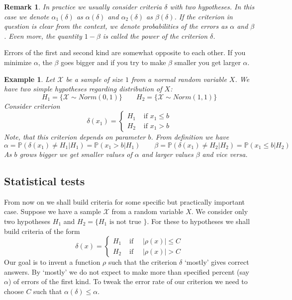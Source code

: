 \documentclass[12pt]{article}
\newtheorem{remark}[theorem]{Remark}
\newtheorem{example}[theorem]{Example}
\begin{document}
\begin{remark} In practice we usually consider criteria $\delta$ with two
    hypotheses. In this case we denote $\alpha_1(\delta)$ as $\alpha(\delta)$
    and $\alpha_2(\delta)$ as $\beta(\delta)$. If the criterion in question is
    clear from the context, we denote probabilities of the errors as $\alpha$
    and $\beta$. Even more, the quantity $1-\beta$ is called the power of the
    criterion $\delta$.
\end{remark}

Errors of the first and second kind are somewhat opposite to each other. If you
minimize $\alpha$, the $\beta$ goes bigger and if you try to make $\beta$
smaller you get larger $\alpha$.

\begin{example} Let $\mathscr{X}$ be a sample of size $1$ from a normal random
    variable $X$. We have two simple hypotheses regarding distribution of $X$:
    $$
        H_1=\{\mathscr{X}\sim Norm(0, 1)\}
        \quad\quad
        H_2=\{\mathscr{X}\sim Norm(1,1)\}
    $$
    Consider criterion
    $$
        \delta(x_1)=
        \begin{cases}
            H_1 & \mbox{ if } x_1\leq b \\
            H_2 & \mbox{ if } x_1> b
        \end{cases}
    $$
    Note, that this criterion depends on parameter $b$. From definition we have
    $$
        \alpha=\mathbb{P}(\delta(x_1)\neq H_1|H_1)=\mathbb{P}(x_1>b|H_1)
        \quad\quad
        \beta=\mathbb{P}(\delta(x_1)\neq H_2|H_2)=\mathbb{P}(x_1\leq b|H_2)
    $$
    As $b$ grows bigger we get smaller values of $\alpha$ and larger values
    $\beta$ and vice versa.
\end{example}


\subsection{Statistical tests}

From now on we shall build criteria for some specific but practically important
case. Suppose we have a sample $\mathscr{X}$ from a random variable $X$.  We
consider only two hypotheses $H_1$ and $H_2=\{H_1\mbox{ is not true }\}$. For
these to hypotheses we shall build criteria of the form
$$
    \delta(x)=
    \begin{cases}
        H_1 & \mbox{ if }\quad |\rho(x)|\leq C \\
        H_2 & \mbox{ if }\quad |\rho(x)|> C
    \end{cases}
$$
Our goal is to invent a function $\rho$ such that the criterion $\delta$
`mostly' gives correct answers. By `mostly' we do not expect to make more than
specified percent (say $\alpha$) of errors of the first kind. To tweak the error
rate of our criterion we need to choose $C$ such that $\alpha(\delta)\leq
    \alpha$.
\end{document}
